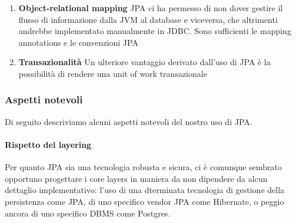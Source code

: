 \begin{enumerate}
          Questa inversione porta i seguenti vantaggi:
          \begin{itemize}
              \item lo schema fisico della persistence unit non è minimamente di intralcio 
                    all'evoluzione della modellazione del dominio, in quanto è automaticamente 
                    inferito da questa in fase di esecuzione
              \item la modellazione del dominio può essere quindi rivista e modificata con la
                    velocità di evoluzone di un tipo Java, incoraggiando la ricerca di
                    soluzioni efficaci per il gli attori del sistema
          \end{itemize}

    \item \textbf{Object-relational mapping} \newline
          JPA ci ha permesso di non dover gestire il flusso di informazione dalla JVM al database e viceversa,
          che altrimenti andrebbe implementato manualmente in JDBC. Sono sufficienti le mapping annotations
          e le convenzioni JPA
    \item \textbf{Transazionalità} \newline
          Un ulteriore vantaggio derivato dall'uso di JPA è la possibilità di rendere una unit of work
          transazionale
\end{enumerate}

\subsubsection{Aspetti notevoli}
Di seguito descriviamo alcuni aspetti notevoli del nostro uso di JPA.

\paragraph{Rispetto del layering} Per quanto JPA sia una tecnologia robusta e sicura, ci è comunque sembrato opportuno progettare i core layers in maniera da non dipendere da alcun dettaglio implementativo:  l'uso di una dterminata tecnologia di gestione della persistenza come JPA, di uno specifico  vendor JPA come Hibernate, o peggio ancora di uno specifico DBMS come Postgres.

